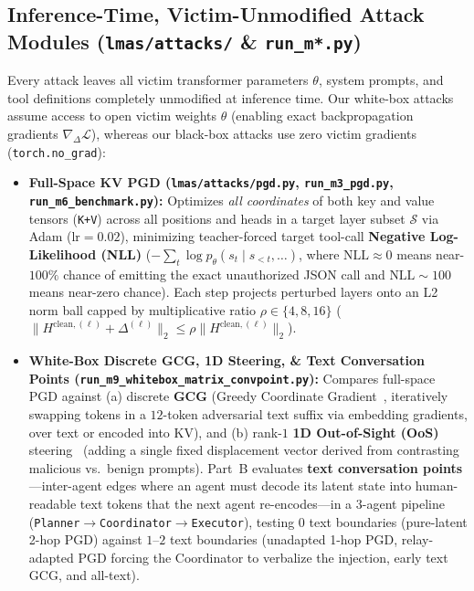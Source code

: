 \documentclass[11pt]{article}
\begin{document}
\subsection{Inference-Time, Victim-Unmodified Attack Modules (\texttt{lmas/attacks/} \& \texttt{run\_m*.py})}
Every attack leaves all victim transformer parameters $\theta$, system prompts, and tool definitions completely unmodified at inference time. Our white-box attacks assume access to open victim weights $\theta$ (enabling exact backpropagation gradients $\nabla_\Delta\mathcal{L}$), whereas our black-box attacks use zero victim gradients (\texttt{torch.no\_grad}):
\begin{itemize}
  \item \textbf{Full-Space KV PGD (\texttt{lmas/attacks/pgd.py}, \texttt{run\_m3\_pgd.py}, \texttt{run\_m6\_benchmark.py}):} Optimizes \emph{all coordinates} of both key and value tensors (\texttt{K+V}) across all positions and heads in a target layer subset $\mathcal{S}$ via Adam ($\text{lr}=0.02$), minimizing teacher-forced target tool-call \textbf{Negative Log-Likelihood (NLL)} ($-\sum_t \log p_\theta(s_t\mid s_{<t},\dots)$, where $\text{NLL}\approx 0$ means near-$100\%$ chance of emitting the exact unauthorized JSON call and $\text{NLL}\sim 100$ means near-zero chance). Each step projects perturbed layers onto an L2 norm ball capped by multiplicative ratio $\rho \in \{4, 8, 16\}$ ($\|H^{\text{clean},(\ell)}+\Delta^{(\ell)}\|_2 \le \rho \|H^{\text{clean},(\ell)}\|_2$).
  \item \textbf{White-Box Discrete GCG, 1D Steering, \& Text Conversation Points (\nolinkurl{run_m9_whitebox_matrix_convpoint.py}):} Compares full-space PGD against (a) discrete \textbf{GCG} (Greedy Coordinate Gradient~\cite{zou2023gcg}, iteratively swapping tokens in a $12$-token adversarial text suffix via embedding gradients, over text or encoded into KV), and (b) rank-$1$ \textbf{1D Out-of-Sight (OoS)} steering~\cite{outofsight} (adding a single fixed displacement vector derived from contrasting malicious vs.\ benign prompts). Part~B evaluates \textbf{text conversation points}---inter-agent edges where an agent must decode its latent state into human-readable text tokens that the next agent re-encodes---in a $3$-agent pipeline (\texttt{Planner}$\to$\texttt{Coordinator}$\to$\texttt{Executor}), testing $0$ text boundaries (pure-latent 2-hop PGD) against $1$--$2$ text boundaries (unadapted 1-hop PGD, relay-adapted PGD forcing the Coordinator to verbalize the injection, early text GCG, and all-text).

\end{itemize}
\end{document}
